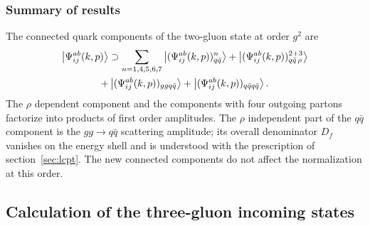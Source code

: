 \subsubsection{Summary of results}
\label{sec:sum-gg}

The connected quark components of the two-gluon state at order $g^{2}$ are
\begin{multline}
\left|\Psi^{ab}_{ij}(k,p)\right\rangle\supset\sum_{n=1,4,5,6,7}\left|(\Psi^{ab}_{ij}(k,p))^{n}_{q\bar q}\right\rangle
+\left|(\Psi^{ab}_{ij}(k,p))^{2+3}_{q\bar q\,\rho}\right\rangle\\
+\left|(\Psi^{ab}_{ij}(k,p))_{ggq\bar q}\right\rangle+\left|(\Psi^{ab}_{ij}(k,p))_{q\bar qq\bar q}\right\rangle .
\label{eq:sum-gg}
\end{multline}
The $\rho$ dependent component and the components with four outgoing partons factorize into
products of first order amplitudes. The $\rho$ independent part of the $q\bar q$ component is the
$gg\to q\bar q$ scattering amplitude; its overall denominator $D_{f}$ vanishes on the energy
shell and is understood with the prescription of section~\ref{sec:lcpt}. The new connected
components do not affect the normalization at this order.

\subsection{Calculation of the three-gluon incoming states}
\label{sec:wf-ggg}

